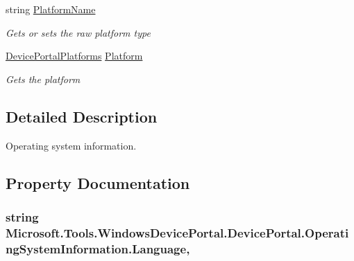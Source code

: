 \begin{DoxyCompactItemize}
string \hyperlink{class_microsoft_1_1_tools_1_1_windows_device_portal_1_1_device_portal_1_1_operating_system_information_aa060a84d320849e2572117b663e16e52}{Platform\+Name}
\begin{DoxyCompactList}\small\item\em Gets or sets the raw platform type \end{DoxyCompactList}\item 
\hyperlink{class_microsoft_1_1_tools_1_1_windows_device_portal_1_1_device_portal_a48a281d856cdc961d5319286d452c9b5}{Device\+Portal\+Platforms} \hyperlink{class_microsoft_1_1_tools_1_1_windows_device_portal_1_1_device_portal_1_1_operating_system_information_afd381ee068682a1d82ed9bb399d461bf}{Platform}
\begin{DoxyCompactList}\small\item\em Gets the platform \end{DoxyCompactList}\end{DoxyCompactItemize}


\subsection{Detailed Description}
Operating system information. 



\subsection{Property Documentation}
\subsubsection[{\texorpdfstring{Language}{Language}}]{\setlength{\rightskip}{0pt plus 5cm}string Microsoft.\+Tools.\+Windows\+Device\+Portal.\+Device\+Portal.\+Operating\+System\+Information.\+Language\hspace{0.3cm}{\ttfamily [get]}, {\ttfamily [set]}}\hypertarget{class_microsoft_1_1_tools_1_1_windows_device_portal_1_1_device_portal_1_1_operating_system_information_a5b45bbbaf30b8af493def3a4cfb8e598}{}\label{class_microsoft_1_1_tools_1_1_windows_device_portal_1_1_device_portal_1_1_operating_system_information_a5b45bbbaf30b8af493def3a4cfb8e598}


